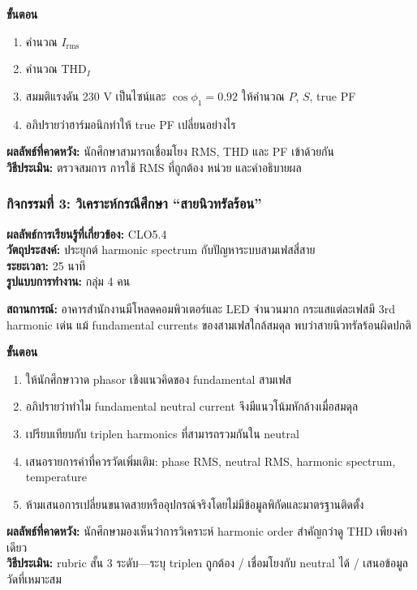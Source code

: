 \textbf{ขั้นตอน}

\begin{enumerate}
    \item คำนวณ $I_{\mathrm{rms}}$
    \item คำนวณ THD$_I$
    \item สมมติแรงดัน 230 V เป็นไซน์และ $\cos\phi_1=0.92$ ให้คำนวณ $P$, $S$, true PF
    \item อภิปรายว่าฮาร์มอนิกทำให้ true PF เปลี่ยนอย่างไร
\end{enumerate}

\textbf{ผลลัพธ์ที่คาดหวัง:} นักศึกษาสามารถเชื่อมโยง RMS, THD และ PF เข้าด้วยกัน \\
\textbf{วิธีประเมิน:} ตรวจสมการ การใช้ RMS ที่ถูกต้อง หน่วย และคำอธิบายผล

\subsubsection{กิจกรรมที่ 3: วิเคราะห์กรณีศึกษา “สายนิวทรัลร้อน”}

\textbf{ผลลัพธ์การเรียนรู้ที่เกี่ยวข้อง:} CLO5.4 \\
\textbf{วัตถุประสงค์:} ประยุกต์ harmonic spectrum กับปัญหาระบบสามเฟสสี่สาย \\
\textbf{ระยะเวลา:} 25 นาที \\
\textbf{รูปแบบการทำงาน:} กลุ่ม 4 คน

\textbf{สถานการณ์:} อาคารสำนักงานมีโหลดคอมพิวเตอร์และ LED จำนวนมาก กระแสแต่ละเฟสมี 3rd harmonic เด่น แม้ fundamental currents ของสามเฟสใกล้สมดุล พบว่าสายนิวทรัลร้อนผิดปกติ

\textbf{ขั้นตอน}

\begin{enumerate}
    \item ให้นักศึกษาวาด phasor เชิงแนวคิดของ fundamental สามเฟส
    \item อภิปรายว่าทำไม fundamental neutral current จึงมีแนวโน้มหักล้างเมื่อสมดุล
    \item เปรียบเทียบกับ triplen harmonics ที่สามารถรวมกันใน neutral
    \item เสนอรายการค่าที่ควรวัดเพิ่มเติม: phase RMS, neutral RMS, harmonic spectrum, temperature
    \item ห้ามเสนอการเปลี่ยนขนาดสายหรืออุปกรณ์จริงโดยไม่มีข้อมูลพิกัดและมาตรฐานติดตั้ง
\end{enumerate}

\textbf{ผลลัพธ์ที่คาดหวัง:} นักศึกษามองเห็นว่าการวิเคราะห์ harmonic order สำคัญกว่าดู THD เพียงค่าเดียว \\
\textbf{วิธีประเมิน:} rubric สั้น 3 ระดับ—ระบุ triplen ถูกต้อง / เชื่อมโยงกับ neutral ได้ / เสนอข้อมูลวัดที่เหมาะสม


